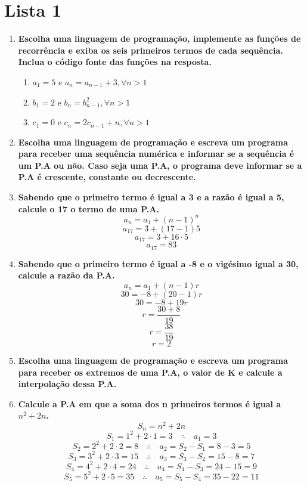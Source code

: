 \section*{Lista 1}

\begin{enumerate}
	\item \textbf{Escolha uma linguagem de programação, implemente as funções de
	recorrência e exiba os seis primeiros termos de cada sequência. Inclua o código fonte das funções na resposta.}
	\begin{enumerate}
		\item $a_1 = 5$ e $a_n = a_{n-1}+3, \forall n > 1$
		
		\pagebreak
		\item $b_1 = 2$ e $b_n = b_{n-1}^2, \forall n > 1$
		
		\item $c_1 = 0$ e $c_n = 2c_{n-1}+n, \forall n > 1$
		
	\end{enumerate}

	\item \textbf{Escolha uma linguagem de programação e escreva um programa para
	receber uma sequência numérica e informar se a sequência é um P.A ou não. Caso seja uma P.A, o programa deve informar se a P.A é crescente, constante ou decrescente.}
	
	
	\item \textbf{Sabendo que o primeiro termo é igual a 3 e a razão é igual a 5, calcule o 17 o termo de uma P.A.}
	$$ a_n = a_1 + (n-1)^n $$
	$$ a_{17} = 3 + (17-1)5 $$
	$$ a_{17} = 3 + 16 \cdot 5 $$
	$$ a_{17} = 83 $$
	
	\item \textbf{Sabendo que o primeiro termo é igual a -8 e o vigésimo igual a 30, calcule a razão da P.A.}
	$$ a_n = a_1 + (n-1)r $$
	$$ 30 = -8 + (20-1)r $$
	$$ 30 = -8 + 19r $$
	$$ r = \frac{30+8}{19} $$
	$$ r = \frac{38}{19} $$
	$$ r = 2 $$
	
	\item \textbf{Escolha uma linguagem de programação e escreva um programa para receber os extremos de uma P.A, o valor de K e calcule a interpolação dessa P.A.}
	
	
	\item \textbf{Calcule a P.A em que a soma dos n primeiros termos é igual a $n^2 + 2n$.}
	$$ S_n = n^2 + 2n$$
	$$ S_1 = 1^2 + 2 \cdot 1 = 3 \quad \therefore \quad a_1 = 3 $$
	$$ S_2 = 2^2 + 2 \cdot 2 = 8 \quad \therefore \quad a_2 = S_2 - S_1 = 8 - 3 = 5 $$
	$$ S_3 = 3^2 + 2 \cdot 3 = 15 \quad \therefore \quad a_3 = S_3 - S_2 = 15 - 8 = 7 $$
	$$ S_4 = 4^2 + 2 \cdot 4 = 24 \quad \therefore \quad a_4 = S_4 - S_3 = 24 - 15 = 9 $$
	$$ S_5 = 5^2 + 2 \cdot 5 = 35 \quad \therefore \quad a_5 = S_5 - S_4 = 35 - 22 = 11 $$
	

\end{enumerate}
